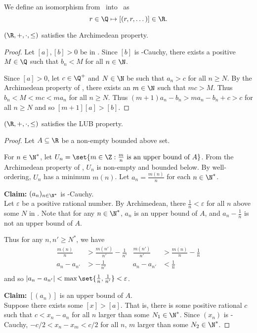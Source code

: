 
We define an isomorphism from \Q\ into \R\ as \[
    r \in \Q \mapsto [(r, r, \dots)] \in \R.
\]
\begin{theorem}
    $(\R, +, \cdot, \le)$ satisfies the Archimedean property.
\end{theorem}
\begin{proof}
    Let $[a], [b] > 0$ be in \R.
    Since $[b]$ is \Q-Cauchy, there exists a positive $M \in \Q$ such that
    $b_n < M$ for all $n \in \N$. %

    Since $[a] > 0$, let $c \in \Q^+$ and $N \in \N$ be such that $a_n > c$
    for all $n \ge N$.
    By the Archimedean property of \Q, there exists an $m \in \N$ such that
    $m c > M$.
    Thus $b_n < M < m c < m a_n$ for all $n \ge N$.
    Thus $(m + 1) a_n - b_n > m a_n - b_n + c > c$ for all $n \ge N$ and so
    $[m + 1] [a] > [b]$.
\end{proof}

\begin{theorem}
    $(\R, +, \cdot, \le)$ satisfies the LUB property.
\end{theorem}
\begin{proof}
    Let $A \subseteq \R$ be a non-empty bounded above set.

    For $n \in \N^*$, let
    $U_n = \set{m \in \Z : \frac mn \text{ is an upper bound of } A}$.
    From the Archimedean property of \R, $U_n$ is non-empty and bounded below.
    By well-ordering, $U_n$ has a minimum $m(n)$.
    Let $a_n = \frac{m(n)}{n}$ for each $n \in \N^*$.

    \textbf{Claim:} $(a_n)_{n \in \N^*}$ is \Q-Cauchy. \\
    Let $\varepsilon$ be a positive rational number.
    By Archimedean, there $\frac1n < \varepsilon$ for all $n$ above some
    $N$ in \N.
    Note that for any $n \in \N^*$, $a_n$ is an upper bound of $A$, and
    $a_n - \frac1n$ is not an upper bound of $A$.

    Thus for any $n, n' \ge N^*$, we have \begin{align*}
        \frac{m(n)}{n} &> \frac{m(n')}{n'} - \frac1{n'}
            & \frac{m(n')}{n'} &> \frac{m(n)}{n} - \frac1n \\
        a_n - a_{n'} &> -\frac1{n'} & a_n - a_{n'} &< \frac1n \\
    \end{align*}
    and so $|a_n - a_{n'}| < \max\set{\frac1n, \frac1{n'}} < \varepsilon$.

    \textbf{Claim:} $[(a_n)]$ is an upper bound of $A$. \\
    Suppose there exists some $[x] > [a]$.
    That is, there is some positive rational $c$ such that $c < x_n - a_n$
    for all $n$ larger than some $N_1 \in \N^*$.
    Since $(x_n)$ is \Q-Cauchy, $-c/2 < x_n - x_m < c/2$ for all $n$, $m$
    larger than some $N_2 \in \N^*$.
\end{proof}
